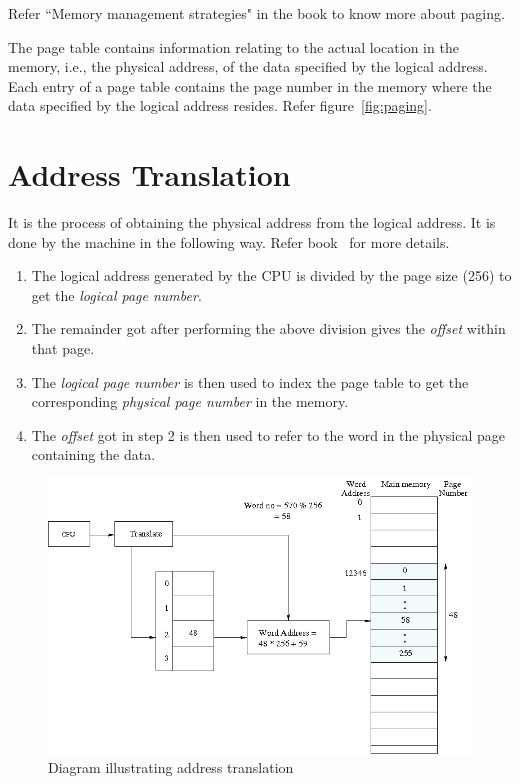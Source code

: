 Refer ``Memory management strategies" in the book \cite{galvin} to know more about paging. 

The page table contains information relating to the actual location in the memory, i.e., the physical address, of the data specified by the logical address. Each entry of a page table contains the page number in the memory where the data specified by the logical address resides. Refer figure~\ref{fig:paging}.


\section{Address Translation} 
It is the process of obtaining the physical address from the logical address. It is done by the machine in the following way. Refer book~\cite{Bach} for more details.

\begin{enumerate}
	\item The logical address generated by the CPU is divided by the page size (256) to get the \emph{logical page number}.
	\item The remainder got after performing the above division gives the \emph{offset} within that page.
	\item The \emph{logical page number} is then used to index the page table to get the corresponding \emph{physical page number} in the memory.
	\item The \emph{offset} got in step 2 is then used to refer to the word in the physical page containing the data.\\
\end{enumerate}

\begin{figure}[h!]
	\centering
	\includegraphics[scale=0.55]{pics/paging_example}
	\caption{Diagram illustrating address translation}
	\label{fig:paging_example}
\end{figure}

